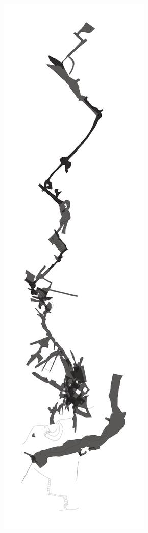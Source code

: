 \documentclass[a1paper,landscape]{article}
\begin{document}

\begin{minipage}{0.2\textwidth}
    \includegraphics[height=\paperheight,keepaspectratio]{../../out/outline.pdf}
\end{minipage}
\end{document}
